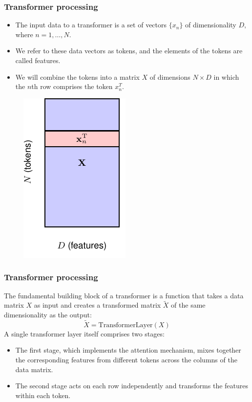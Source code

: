 \documentclass{beamer}
\begin{document}
\begin{frame}
    \frametitle{Transformer processing}
    \begin{itemize}
        \item The input data to a transformer is a set of vectors $\{x_{n}\}$ of dimensionality $D$, where $n=1,\hdots,N$.
        \item We refer to these data vectors as tokens, and the elements of the tokens are called features.
        \item We will combine the tokens into a matrix $X$ of dimensions $N\times{}D$ in which the $n$th row comprises the token $x_{n}^{T}$.
    \end{itemize}
    \begin{figure}
        \includegraphics[height=0.4\textheight]{Figure_3.pdf}
    \end{figure}
\end{frame}

\begin{frame}
    \frametitle{Transformer processing}
    The fundamental building block of a transformer is a function that takes a data matrix $X$ as input and creates a transformed matrix $\tilde{X}$ of the same dimensionality as the output:
    \begin{equation*}
        \tilde{X}=\mathrm{TransformerLayer}(X)
    \end{equation*}
    A single transformer layer itself comprises two stages:
    \begin{itemize}
        \item The first stage, which implements the attention mechanism, mixes together the corresponding features from different tokens across the columns of the data matrix.
        \item The second stage acts on each row independently and transforms the features within each token.
    \end{itemize}
\end{frame}
\end{document}
